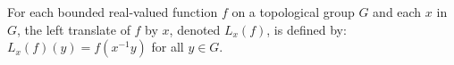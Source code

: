 For each bounded real-valued function $f$ on a topological group $G$ and each $x$ in $G$, the left translate of $f$ by $x$, denoted $L_x(f)$, is defined by: $L_x(f)(y) = f(x^{-1}y)$ for all $y \in G$.
